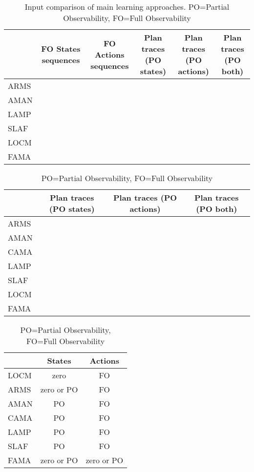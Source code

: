 \begin{table}
	\small
	\centering
	\begin{tabular}{ l | c | c | c | c | c |}
		& \multicolumn{1}{|p{2cm}|}{FO States sequences}
		& \multicolumn{1}{|p{2cm}|}{FO Actions sequences}
		& \multicolumn{1}{|p{2cm}|}{Plan traces (PO states)}
		& \multicolumn{1}{|p{2cm}|}{Plan traces (PO actions)}
		& \multicolumn{1}{|p{2cm}|}{Plan traces (PO both)}   \\
		\hline			
		ARMS &  & \checkmark & \checkmark & & \\
		AMAN & & & \checkmark & &\\
		LAMP & & & \checkmark & &\\
		SLAF & & & \checkmark & &\\
		LOCM & & \checkmark & & &\\
		FAMA & \checkmark & \checkmark &  \checkmark & \checkmark & \checkmark \\
	\end{tabular}
	\caption{Input comparison of main learning approaches. PO=Partial Observability, FO=Full Observability}
	\label{table:input_comparison}
\end{table}	


\begin{table}
	\small
	\centering
	\begin{tabular}{ l | c | c | c |}
		& \multicolumn{1}{|p{2cm}|}{Plan traces (PO states)}
		& \multicolumn{1}{|p{2cm}|}{Plan traces (PO actions)}
		& \multicolumn{1}{|p{2cm}|}{Plan traces (PO both)}   \\
		\hline			
		ARMS & \checkmark & & \\
		AMAN & \checkmark & & \\
		CAMA & \checkmark & & \\
		LAMP & \checkmark & & \\
		SLAF & \checkmark & & \\
		LOCM & \checkmark & & \\
		FAMA & \checkmark & \checkmark & \checkmark \\
	\end{tabular}
	\caption{PO=Partial Observability, FO=Full Observability}
	\label{table:input_comparison2}
\end{table}	


\begin{table}
	\small
	\centering
	\begin{tabular}{ l | c | c |}
		& States
		& Actions  \\
		\hline
		LOCM & zero & FO\\		
		ARMS & zero or PO & FO \\
		AMAN & PO & FO \\
		CAMA & PO & FO \\
		LAMP & PO & FO \\
		SLAF & PO & FO \\		
		FAMA & zero or PO & zero or PO \\
	\end{tabular}
	\caption{PO=Partial Observability, FO=Full Observability}
	\label{table:input_comparison3}
\end{table}	

